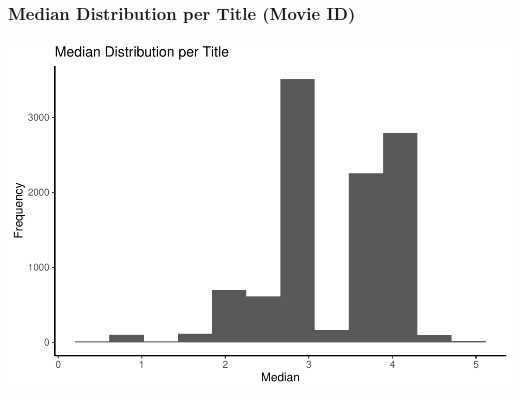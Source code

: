 \documentclass[
]{article}
\begin{document}
\hypertarget{median-distribution-per-title-movie-id}{%
\subsubsection{Median Distribution per Title (Movie
ID)}\label{median-distribution-per-title-movie-id}}

\begin{center}\includegraphics{MovieLens-Project-Report_files/figure-latex/unnamed-chunk-24-1} \end{center}
\end{document}
